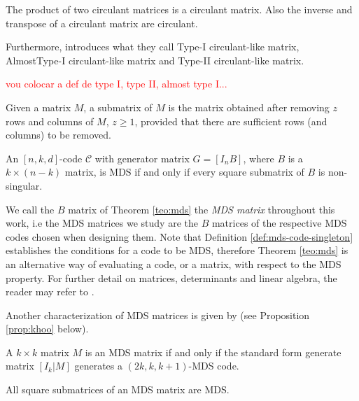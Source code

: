 \begin{lemma}
The product of two circulant matrices is a circulant matrix. Also the inverse and transpose of a circulant matrix are circulant.
\end{lemma}

Furthermore, \cite{RecursiveMDS2017} introduces what they call Type-I circulant-like matrix, AlmostType-I circulant-like matrix and Type-II circulant-like matrix.

\begin{definition}
\textcolor{red}{vou colocar a def de type I, type II, almost type I...}
\end{definition}

\begin{definition}[Submatrix]
Given a matrix $M$, a submatrix of $M$ is the matrix obtained after removing $z$ rows and columns of $M$, $z \geq 1$, provided that there are sufficient rows (and columns) to be removed.
\end{definition}

\begin{theorem}\label{teo:mds}
An $[n, k, d]$-code $\mathcal{C}$ with generator matrix $G = [I_nB]$, where $B$ is a $k \times (n - k)$ matrix, is MDS if and only if every square submatrix of $B$ is non-singular.
\end{theorem}

We call the $B$ matrix of Theorem \ref{teo:mds} the \emph{MDS matrix} throughout this work, i.e the MDS matrices we study are the $B$ matrices of the respective MDS codes chosen when designing them.
Note that Definition \ref{def:mds-code-singleton} establishes the conditions for a code to be MDS, therefore Theorem \ref{teo:mds} is an alternative way of evaluating a code, or a matrix, with respect to the MDS property.
For further detail on matrices, determinants and linear algebra, the reader may refer to \cite{LangeLinearAlgebra}.

Another characterization of MDS matrices is given by \cite{LwInvolKhoo2015} (see Proposition \ref{prop:khoo} below).

\begin{proposition}\label{prop:khoo}
A $k \times k$ matrix $M$ is an MDS matrix if and only if the standard form generate matrix $[I_k|M]$ generates a $(2k, k, k+1)$-MDS code.
\end{proposition}

\begin{fact}
All square submatrices of an MDS matrix are MDS.
\end{fact}

